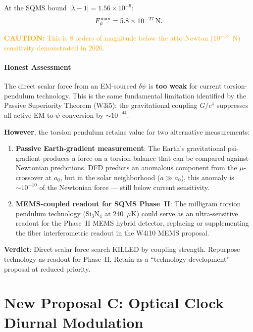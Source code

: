 \documentclass[11pt]{article}
\newcommand{\ee}[1]{\times 10^{#1}}
\newcommand{\lbone}{|\lambda - 1|}
\newcommand{\dpsi}{\delta\psi}
\newcommand{\caution}[1]{\textcolor{orange}{\textbf{CAUTION:} #1}}
\begin{document}
At the SQMS bound $\lbone = 1.56\ee{-9}$:
\begin{equation}
F_\psi^{\rm max} = 5.8\ee{-27}\,\text{N}.
\end{equation}

\caution{This is 8 orders of magnitude below the atto-Newton
($10^{-18}$~N) sensitivity demonstrated in 2026.}

\subsection{Honest Assessment}

The direct scalar force from an EM-sourced $\dpsi$ is \textbf{too weak}
for current torsion-pendulum technology. This is the same fundamental
limitation identified by the Passive Superiority Theorem (W3i5): the
gravitational coupling $G/c^4$ suppresses all active EM-to-$\psi$
conversion by $\sim 10^{-44}$.

\textbf{However}, the torsion pendulum retains value for two alternative
measurements:

\begin{enumerate}
\item \textbf{Passive Earth-gradient measurement}: The Earth's
  gravitational psi-gradient produces a force on a torsion balance
  that can be compared against Newtonian predictions. DFD predicts
  an anomalous component from the $\mu$-crossover at $a_0$, but in
  the solar neighborhood ($a \gg a_0$), this anomaly is $\sim 10^{-10}$
  of the Newtonian force --- still below current sensitivity.

\item \textbf{MEMS-coupled readout for SQMS Phase~II}: The milligram
  torsion pendulum technology (Si$_3$N$_4$ at 240~$\mu$K) could serve
  as an ultra-sensitive readout for the Phase~II MEMS hybrid detector,
  replacing or supplementing the fiber interferometric readout in the
  W4i10 MEMS proposal.
\end{enumerate}

\textbf{Verdict}: Direct scalar force search KILLED by coupling
strength. Repurpose technology as readout for Phase~II.
Retain as a ``technology development'' proposal at reduced priority.


\part{New Proposal C: Optical Clock Diurnal Modulation}
\label{part:clocks}
\end{document}
